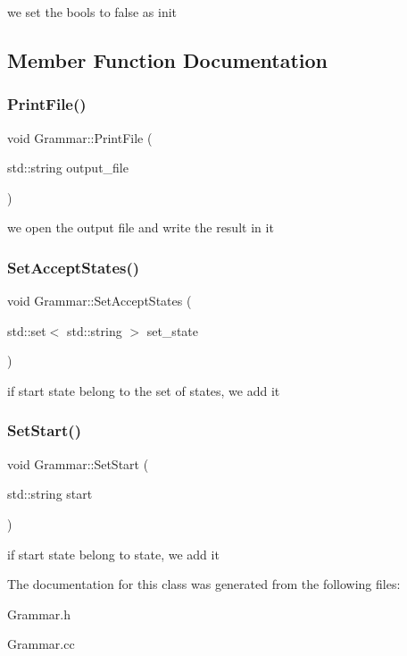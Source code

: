 we set the bools to false as init 

\subsection{Member Function Documentation}
\mbox{\label{classGrammar_a4bb28fac57fe1177d5e95e833d3717d1}} 
\subsubsection{\texorpdfstring{Print\+File()}{PrintFile()}}
{\footnotesize\ttfamily void Grammar\+::\+Print\+File (\begin{DoxyParamCaption}\item[{std\+::string}]{output\+\_\+file }\end{DoxyParamCaption})}

we open the output file and write the result in it \mbox{\label{classGrammar_a182676fa0ce7f6ce737a2fd4c357b3e2}} 
\subsubsection{\texorpdfstring{Set\+Accept\+States()}{SetAcceptStates()}}
{\footnotesize\ttfamily void Grammar\+::\+Set\+Accept\+States (\begin{DoxyParamCaption}\item[{std\+::set$<$ std\+::string $>$}]{set\+\_\+state }\end{DoxyParamCaption})}

if start state belong to the set of states, we add it \mbox{\label{classGrammar_a8729a9cee27c29079970a78163c8ed0f}} 
\subsubsection{\texorpdfstring{Set\+Start()}{SetStart()}}
{\footnotesize\ttfamily void Grammar\+::\+Set\+Start (\begin{DoxyParamCaption}\item[{std\+::string}]{start }\end{DoxyParamCaption})}

if start state belong to state, we add it 

The documentation for this class was generated from the following files\+:\begin{DoxyCompactItemize}
\item 
Grammar.\+h\item 
Grammar.\+cc\end{DoxyCompactItemize}
